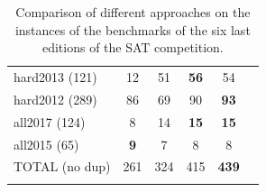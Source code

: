 \begin{table}[t]
{{\begin{tabular}{l|ccccc}
    hard2013 (121) & 12 & 51 & \cellcolor{gray!30}\textbf{56} & 54\\
    hard2012 (289) & 86 & 69 & 90 & \cellcolor{gray!30}\textbf{93}\\
    \hline
    all2017 (124) & 8 & 14 & \cellcolor{gray!30}\textbf{15} & \cellcolor{gray!30}\textbf{15}\\
    all2015 (65) & \cellcolor{gray!30}\textbf{9} & 7 & 8 & 8\\
    \hline
    TOTAL (no dup) & 261 & 324 & 415 & \cellcolor{gray!30}\textbf{439}\\
    \label{table:unsat:bliss}
   \end{tabular}
  }
 }
 \vspace*{0.1cm}
 \caption{Comparison of different approaches on the \unsat instances of the benchmarks of the six last editions of the SAT competition.}
 \label{table:benchUNSAT}
\end{table}
